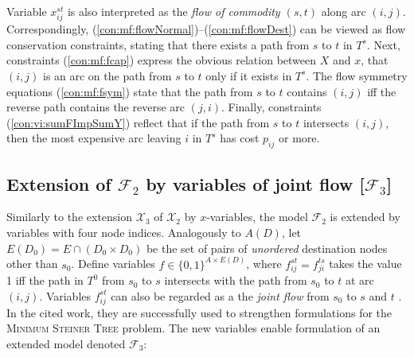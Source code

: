 Variable $x_{ij}^{st}$ is also interpreted as the \emph{flow of commodity $(s,t)$} along arc $(i,j)$.
Correspondingly, (\ref{con:mf:flowNormal})--(\ref{con:mf:flowDest}) can be viewed as flow conservation constraints,
stating that there exists a path from $s$ to $t$ in $T^s$.
Next, constraints (\ref{con:mf:fcap}) express the obvious relation between $X$ and $x$, that $(i,j)$ is an arc on the path from $s$ to $t$ only if it exists in $T^s$.
The flow symmetry equations (\ref{con:mf:fsym}) state that the path from $s$ to $t$ contains $(i,j)$ iff the reverse path contains the reverse arc $(j,i)$.
Finally, constraints (\ref{con:vi:sumFImpSumY}) reflect that if the path from $s$ to $t$ intersects $(i,j)$,
then the most expensive arc leaving $i$ in $T^s$ has cost $p_{ij}$ or more.


\subsection{Extension of $\mathcal{F}_2$ by variables of joint flow [$\mathcal{F}_3$]}

Similarly to the extension $\mathcal{X}_3$ of $\mathcal{X}_2$ by $x$-variables, the model $\mathcal{F}_2$ is extended by variables with four node indices.
Analogously to $A(D)$, let $E(D_0)=E\cap (D_0\times D_0)$ be the set of pairs of \emph{unordered} destination nodes other than $s_0$.
Define variables $f\in\{0,1\}^{A\times E(D)}$, where
$f_{ij}^{st}=f_{ji}^{ts}$ takes the value 1 iff the path in $T^0$ from $s_0$ to $s$ intersects with the path from $s_0$ to $t$ at arc $(i,j)$.
%
Variables $f_{ij}^{st}$ can also be regarded as a the \emph{joint flow} from $s_0$ to $s$ and $t$ \citep{Polzin}.
In the cited work, they are successfully used to strengthen formulations for the \textsc{Minimum Steiner Tree} problem.
The new variables enable formulation of an extended model denoted $\mathcal{F}_3$: 

